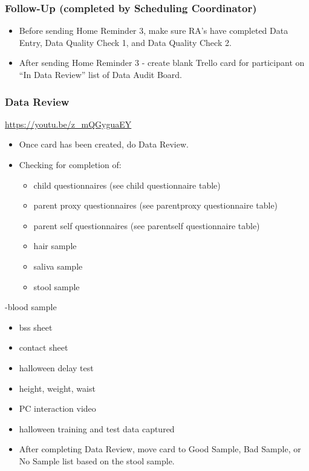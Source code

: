\documentclass[]{book}
\begin{document}
\hypertarget{follow-up-completed-by-scheduling-coordinator-3}{%
\subsubsection{Follow-Up (completed by Scheduling Coordinator)}\label{follow-up-completed-by-scheduling-coordinator-3}}

\begin{itemize}
\item
  Before sending Home Reminder 3, make sure RA's have completed Data Entry, Data Quality Check 1, and Data Quality Check 2.
\item
  After sending Home Reminder 3 - create blank Trello card for participant on ``In Data Review'' list of Data Audit Board.
\end{itemize}

\hypertarget{data-review-2}{%
\subsubsection{Data Review}\label{data-review-2}}

\url{https://youtu.be/z_mQGyguaEY}

\begin{itemize}
\item
  Once card has been created, do Data Review.
\item
  Checking for completion of:

  \begin{itemize}
  \item
    child questionnaires (see child questionnaire table)
  \item
    parent proxy questionnaires (see parentproxy questionnaire table)
  \item
    parent self questionnaires (see parentself questionnaire table)
  \item
    hair sample
  \item
    saliva sample
  \item
    stool sample
  \end{itemize}
\end{itemize}

-blood sample

\begin{itemize}
\item
  bss sheet
\item
  contact sheet
\item
  halloween delay test
\item
  height, weight, waist
\item
  PC interaction video
\item
  halloween training and test data captured
\item
  After completing Data Review, move card to Good Sample, Bad Sample, or No Sample list based on the stool sample.
\end{itemize}
\end{document}

